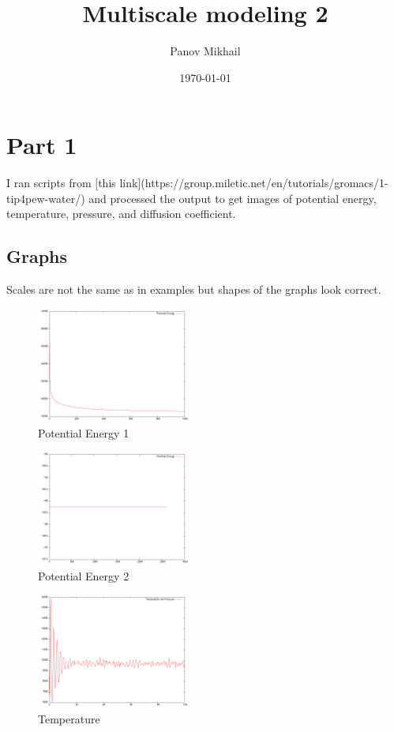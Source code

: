 \documentclass[a4paper,11pt]{article}
\title{Multiscale modeling 2}
\author{Panov Mikhail}
\date{\today}
\begin{document}
\maketitle
\tableofcontents
\newpage


\section{Part 1}
I ran scripts from [this link](https://group.miletic.net/en/tutorials/gromacs/1-tip4pew-water/) and processed the output to get images of potential energy, temperature, pressure, and diffusion coefficient.

\subsection{Graphs}
Scales are not the same as in examples but shapes of the graphs look correct.
\begin{figure}[htbp]
    \centering
    \includegraphics[width=0.45\textwidth]{min-energy.png}
    \caption{Potential Energy 1}
    \label{fig:pot_energy1}
\end{figure}

\begin{figure}[htbp]
    \centering
    \includegraphics[width=0.45\textwidth]{min2-energy.png}
    \caption{Potential Energy 2}
    \label{fig:pot_energy2}
\end{figure}

\begin{figure}[htbp]
    \centering
    \includegraphics[width=0.45\textwidth]{eql-temp.png}
    \caption{Temperature}
    \label{fig:temperature}
\end{figure}
\end{document}
